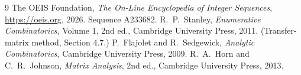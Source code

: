 \documentclass[11pt,a4paper]{article}
\theoremstyle{plain}
\theoremstyle{definition}
\begin{document}
\begin{thebibliography}{9}
 The OEIS Foundation, \emph{The On-Line Encyclopedia of Integer
Sequences}, \url{https://oeis.org}, 2026. Sequence A233682.
 R.~P.~Stanley, \emph{Enumerative Combinatorics}, Volume 1, 2nd ed.,
Cambridge University Press, 2011. (Transfer-matrix method, Section 4.7.)
 P.~Flajolet and R.~Sedgewick, \emph{Analytic Combinatorics}, Cambridge
University Press, 2009.
 R.~A.~Horn and C.~R.~Johnson, \emph{Matrix Analysis}, 2nd ed., Cambridge
University Press, 2013.
\end{thebibliography}
\end{document}

